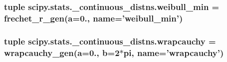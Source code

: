 \subsubsection[{weibull\+\_\+min}]{\setlength{\rightskip}{0pt plus 5cm}tuple scipy.\+stats.\+\_\+continuous\+\_\+distns.\+weibull\+\_\+min = {\bf frechet\+\_\+r\+\_\+gen}({\bf a}=0., name='weibull\+\_\+min')}\label{namespacescipy_1_1stats_1_1__continuous__distns_a76212d97d9fb397339dcfe7c4cf38f8f}
\hypertarget{namespacescipy_1_1stats_1_1__continuous__distns_a66f4ceb22239ae804f207e3dcb6bcc4b}{}
\subsubsection[{wrapcauchy}]{\setlength{\rightskip}{0pt plus 5cm}tuple scipy.\+stats.\+\_\+continuous\+\_\+distns.\+wrapcauchy = {\bf wrapcauchy\+\_\+gen}({\bf a}=0., {\bf b}=2$\ast$pi, name='wrapcauchy')}\label{namespacescipy_1_1stats_1_1__continuous__distns_a66f4ceb22239ae804f207e3dcb6bcc4b}
